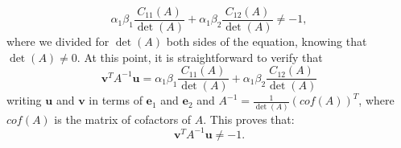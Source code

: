 \documentclass[a4paper]{report}
\numberwithin{equation}{chapter}
\begin{document}
\begin{equation}\label{key}
	 \alpha_1 \beta_1 \frac{C_{11}(A)}{\det(A)} + \alpha_1 \beta_2 \frac{C_{12}(A)}{\det(A)} \neq -1,
\end{equation}
where we divided for $\det(A)$ both sides of the equation, knowing that $\det(A) \neq 0$. At this point, it is straightforward to verify that 
\begin{equation}\label{key}
	\textbf{v}^T A^{-1} \textbf{u} = \alpha_1 \beta_1 \frac{C_{11}(A)}{\det(A)} + \alpha_1 \beta_2 \frac{C_{12}(A)}{\det(A)}
\end{equation}
writing $\textbf{u}$ and $\textbf{v}$ in terms of $\textbf{e}_1$ and $\textbf{e}_2$ and $A^{-1} = \frac{1}{\det(A)} (cof(A))^T$, where $cof(A)$ is the matrix of cofactors of $A$. This proves that:
\begin{equation}\label{key}
	\textbf{v}^T A^{-1} \textbf{u} \neq -1.
\end{equation}
\end{document}
